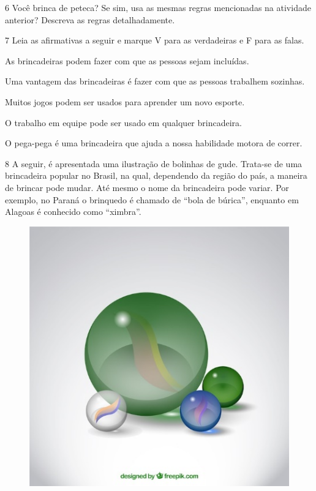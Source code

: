 \begin{multicols}{2}





\end{multicols}



\num{6} Você brinca de peteca? Se sim, usa as mesmas regras mencionadas na atividade anterior? Descreva as regras detalhadamente.


\num{7} Leia as afirmativas a seguir e marque V para as verdadeiras e F para
  as falas.

\begin{boxlist}
 As brincadeiras podem fazer com que as pessoas sejam incluídas.

 Uma vantagem das brincadeiras é fazer com que as pessoas trabalhem sozinhas.

 Muitos jogos podem ser usados para aprender um novo esporte.

 O trabalho em equipe pode ser usado em qualquer brincadeira.

 O pega-pega é uma brincadeira que ajuda a nossa habilidade motora de correr.
\end{boxlist}


\pagebreak
\num{8} A seguir, é apresentada uma ilustração de bolinhas de gude. Trata-se de uma
  brincadeira popular no Brasil, na qual, dependendo da região do país, a
  maneira de brincar pode mudar. Até mesmo o nome da brincadeira pode variar. Por exemplo, no Paraná o brinquedo é chamado de “bola de búrica”, enquanto em Alagoas
  é conhecido como “ximbra”.

\begin{figure}
\includegraphics[width=.2\textwidth]{./imgs/img10.jpg}
\end{figure}

